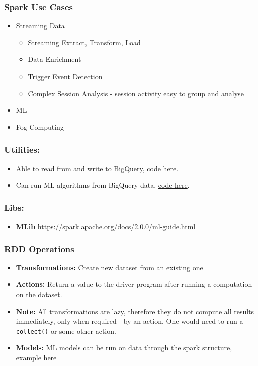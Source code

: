 \documentclass[english]{article}
\begin{document}
\subsubsection{Spark Use Cases}
\begin{itemize}
\item Streaming Data
	\begin{itemize}
		\item Streaming Extract, Transform, Load
		\item Data Enrichment
		\item Trigger Event Detection
		\item Complex Session Analysis - session activity easy to group and analyse
	\end{itemize}
\item ML
\item Fog Computing
\end{itemize}
\subsubsection{Utilities:}
\begin{itemize}
\item Able to read from and write to BigQuery, \href{https://cloud.google.com/dataproc/docs/tutorials/bigquery-connector-spark-example}{code here}.
\item Can run ML algorithms from BigQuery data, \href{https://cloud.google.com/dataproc/docs/tutorials/bigquery-sparkml#spark-ml-tutorial_subset-python}{code here}.
\end{itemize}
\subsubsection{Libs:}
\begin{itemize}
\item \textbf{MLib} \url{https://spark.apache.org/docs/2.0.0/ml-guide.html}
\end{itemize}
\subsubsection{RDD Operations}
\begin{itemize}
\item \textbf{Transformations:} Create new dataset from an existing one
\item \textbf{Actions:} Return a value to the driver program after running a computation on the dataset.
\item \textbf{Note:} All transformations are lazy, therefore they do not compute all results immediately, only when required - by an action. One would need to run a \verb"collect()" or some other action.
\item \textbf{Models:} ML models can be run on data through the spark structure, \href{https://github.com/apache/spark/blob/master/examples/src/main/python/kmeans.py}{example here}
\end{itemize}
\end{document}
